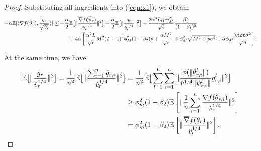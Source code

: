 \documentclass[nohyperref]{article}
\theoremstyle{plain}
\theoremstyle{definition}
\theoremstyle{remark}
\begin{document}
\begin{proof}
Substituting all ingredients into (\ref{eqn:x1}), we obtain
\begin{align}\notag
    -\alpha \mathbb E[\langle \nabla f(\bar \vartheta_r),\frac{\bar g_r}{\sqrt{\hat v_r}} \rangle] &\leq -\frac{\alpha}{2}\mathbb E\big[\Vert \frac{\nabla f(\bar\vartheta_r) }{\hat v_r^{1/4}}\Vert^2 \big]-\frac{\alpha}{2}\mathbb E\big[\Vert \frac{\bar g_r }{\hat v_r^{1/4}}\Vert^2 \big]+\frac{2\alpha^3 L_\ell p\phi_M^2}{ \sqrt{\epsilon}}\frac{\beta_1^2}{(1-\beta_1)^2} \\\notag
    &\hspace{0.4in}  + 4 \alpha \left[ \frac{\alpha^2 L}{\sqrt{\epsilon}} M^2 (T-1)^2 \phi_M^2 (1-\beta_2)p + \frac{\alpha M^2}{\sqrt{\epsilon}}+\phi_M^2\sqrt{M^2+p\sigma^2} +\alpha \phi_M \frac{\tot \sigma^2}{\sqrt{n}}\right].
\end{align}


At the same time, we have
\begin{align}\notag
    \mathbb E\big[\Vert \frac{\bar g_r }{\hat v_r^{1/4}}\Vert^2\big]=\frac{1}{n^2}\mathbb E\big[\Vert \frac{\sum_{i=1}^n \bar g_{r,i}}{\hat v_r^{1/4}}\Vert^2 \big] &=\frac{1}{n^2}\mathbb E\big[ \sum_{l=1}^L \sum_{i=1}^n \Vert  \frac{\phi(\Vert \theta_{r,i}^l\Vert)}{\hat v^{1/4} \Vert \psi_{r,i}^l\Vert}g_{r,i}^l \Vert^2 \big] \\
    &\geq \phi_m^2(1-\beta_2) \mathbb E\left[ \Vert \frac{1}{n}\sum_{i=1}^n \frac{\nabla f(\theta_{r,i})}{\hat v^{1/4}_r} \Vert^2 \right]\\\notag
    &=\phi_m^2(1-\beta_2) \mathbb E\left[ \Vert  \frac{\overline\nabla f(\theta_{r})}{\hat v^{1/4}_r} \Vert^2 \right]. \notag
\end{align}




\end{proof}
\end{document}
